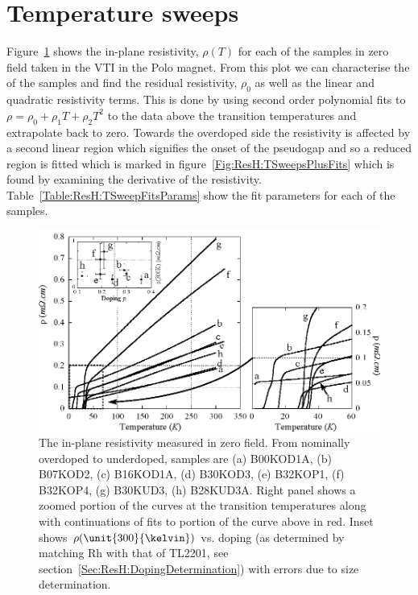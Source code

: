 \section{Temperature sweeps}

Figure~\ref{Fig:ResH:TSweeps} shows the in-plane resistivity, $\rho(T)$ for each of the samples in zero field taken in the \ac{VTI} in the Polo magnet. From this plot we can characterise the \Tc of the samples and find the residual resistivity, $\rho_0$ as well as the linear and quadratic resistivity terms. This is done by using second order polynomial fits to $\rho = \rho_0 + \rho_1 T + \rho_2 T^2$ to the data above the transition temperatures and extrapolate back to zero. Towards the overdoped side the resistivity is affected by a second linear region which signifies the onset of the pseudogap and so a reduced region is fitted which is marked in figure~\ref{Fig:ResH:TSweepsPlusFits} which is found by examining the derivative of the resistivity.  Table~\ref{Table:ResH:TSweepFitsParams} show the fit parameters for each of the samples. 
\begin{figure}[htbp]
	\begin{center}
		\includegraphics[scale=1.0]{Chapter-HallBSCO/Figures/TSweeps/TSweeps}
		\caption{The in-plane resistivity measured in zero field. From nominally overdoped to underdoped, samples are (a) B00KOD1A, (b) B07KOD2, (c) B16KOD1A, (d) B30KOD3, (e) B32KOP1, (f) B32KOP4, (g) B30KUD3, (h) B28KUD3A. Right panel shows a zoomed portion of the curves at the transition temperatures along with continuations of fits to portion of the curve above \Tc in red. Inset shows $\rho(\unit{300}{\kelvin})$ vs. doping (as determined by matching Rh with that of \ac{TL2201}, see section~\ref{Sec:ResH:DopingDetermination}) with errors due to size determination.}
		\label{Fig:ResH:TSweeps}
	\end{center}
\end{figure}
